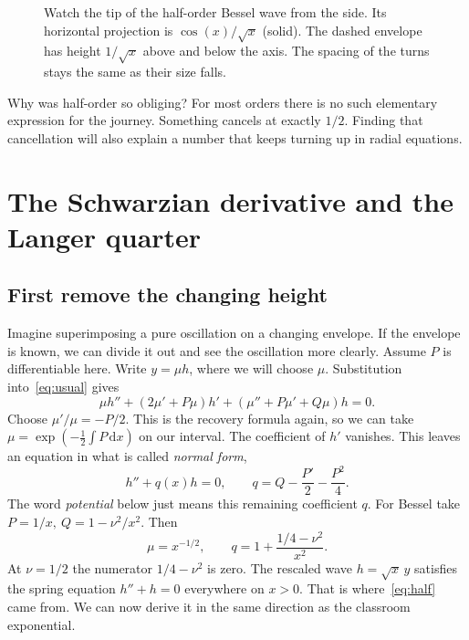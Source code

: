 \documentclass[11pt,a4paper]{amsart}
\newcommand{\dif}{\mathrm{d}}
\theoremstyle{definition}
\theoremstyle{remark}
\begin{document}
\begin{figure}[htbp]
\centering
{}
\caption{Watch the tip of the half-order Bessel wave from the side. Its horizontal projection is \(\cos(x)/\sqrt{x}\) (solid). The dashed envelope has height \(1/\sqrt{x}\) above and below the axis. The spacing of the turns stays the same as their size falls.}\label{fig:wave}
\end{figure}

Why was half-order so obliging? For most orders there is no such elementary expression for the journey. Something cancels at exactly \(1/2\). Finding that cancellation will also explain a number that keeps turning up in radial equations.

\section{The Schwarzian derivative and the Langer quarter}\label{sec:schwarz}
\subsection{First remove the changing height}
Imagine superimposing a pure oscillation on a changing envelope. If the envelope is known, we can divide it out and see the oscillation more clearly. Assume \(P\) is differentiable here. Write \(y=\mu h\), where we will choose \(\mu\). Substitution into~\eqref{eq:usual} gives
\[
 \mu h''+(2\mu'+P\mu)h'+(\mu''+P\mu'+Q\mu)h=0 .
\]
Choose \(\mu'/\mu=-P/2\). This is the recovery formula again, so we can take
\(\mu=\exp(-\frac12\int P\,\dif x)\) on our interval. The coefficient of \(h'\) vanishes. This leaves an equation in what is called \emph{normal form},
\begin{equation}\label{eq:normal}
 h''+q(x)h=0,\qquad q=Q-\frac{P'}{2}-\frac{P^2}{4}.
\end{equation}
The word \emph{potential} below just means this remaining coefficient \(q\). For Bessel take \(P=1/x,\ Q=1-\nu^2/x^2\). Then
\[
 \mu=x^{-1/2},\qquad q=1+\frac{1/4-\nu^2}{x^2}.
\]
At \(\nu=1/2\) the numerator \(1/4-\nu^2\) is zero. The rescaled wave \(h=\sqrt{x}\,y\) satisfies the spring equation \(h''+h=0\) everywhere on \(x>0\). That is where~\eqref{eq:half} came from. We can now derive it in the same direction as the classroom exponential.
\end{document}
